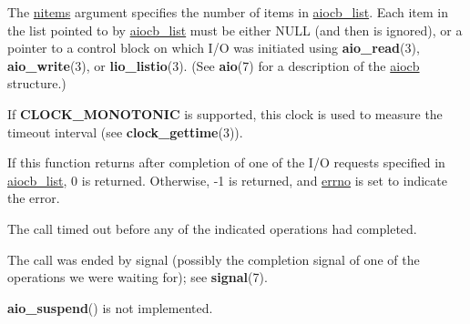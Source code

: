 \documentclass[]{article}
\let\realtextbf=\textbf
\renewcommand{\textbf}[1]{\textcolor{boldcolor}{\realtextbf{#1}}}
\renewcommand{\emph}[1]{\underline{#1}}
\begin{document}
The \emph{nitems} argument specifies the number of items in
\emph{aiocb\_list}. Each item in the list pointed to by
\emph{aiocb\_list} must be either NULL (and then is ignored), or a
pointer to a control block on which I/O was initiated using
\textbf{aio\_read}(3), \textbf{aio\_write}(3), or
\textbf{lio\_listio}(3). (See \textbf{aio}(7) for a description of the
\emph{aiocb} structure.)

If \textbf{CLOCK\_MONOTONIC} is supported, this clock is used to measure
the timeout interval (see \textbf{clock\_gettime}(3)).


If this function returns after completion of one of the I/O requests
specified in \emph{aiocb\_list}, 0 is returned. Otherwise, -1 is
returned, and \emph{errno} is set to indicate the error.


\begin{description}
\itemsep1pt\parskip0pt
\item[\textbf{EAGAIN}]
The call timed out before any of the indicated operations had completed.
\end{description}

\begin{description}
\itemsep1pt\parskip0pt
\item[\textbf{EINTR}]
The call was ended by signal (possibly the completion signal of one of
the operations we were waiting for); see \textbf{signal}(7).
\end{description}

\begin{description}
\itemsep1pt\parskip0pt
\item[\textbf{ENOSYS}]
\textbf{aio\_suspend}() is not implemented.
\end{description}

\end{document}
